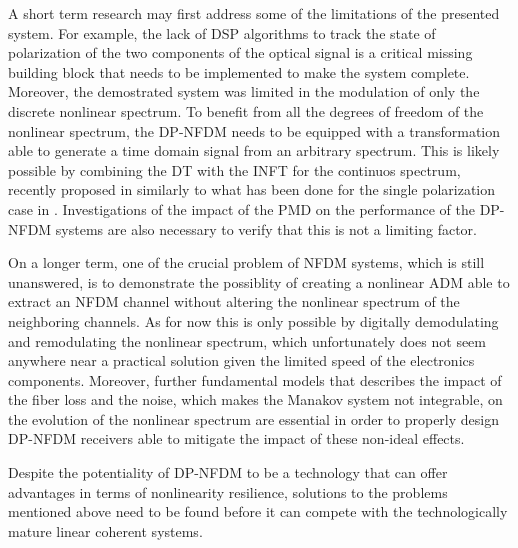 A short term research may first address some of the limitations of the presented system. For example, the lack of \ac{DSP} algorithms to  track the state of polarization of the two components of the optical signal is a critical missing building block that needs to be implemented to make the system complete.
Moreover, the demostrated system was limited in the modulation of only the discrete nonlinear spectrum. To benefit from all the degrees of freedom of the nonlinear spectrum, the \ac{DP-NFDM} needs to be equipped with a transformation able to generate a time domain signal from an arbitrary spectrum. This is likely possible by combining the \ac{DT} with the \ac{INFT} for the continuos spectrum, recently proposed in \cite{Goossens:17,} similarly to what has been done for the single polarization case in \cite{aref2016demonstration}.
Investigations of the impact of the \ac{PMD} on the performance of the \ac{DP-NFDM} systems are also necessary to verify that this is not a limiting factor.

On a longer term, one of the crucial problem of \ac{NFDM} systems, which is still unanswered, is to demonstrate the possiblity of creating a nonlinear \ac{ADM} able to extract an \ac{NFDM} channel without altering the nonlinear spectrum of the neighboring channels. As for now this is only possible by digitally demodulating and remodulating  the nonlinear spectrum, which unfortunately does not seem anywhere near a practical solution given the limited speed of the electronics components.
Moreover, further fundamental models that describes the impact of the fiber loss and the noise, which makes the Manakov system not integrable, on the evolution of the nonlinear spectrum are essential in order to properly design \ac{DP-NFDM} receivers able to mitigate the impact of these non-ideal effects.

Despite the potentiality of \ac{DP-NFDM} to be a technology that can offer advantages in terms of nonlinearity resilience,
solutions to the problems mentioned above need to be found before it can compete with the technologically mature linear coherent systems.

